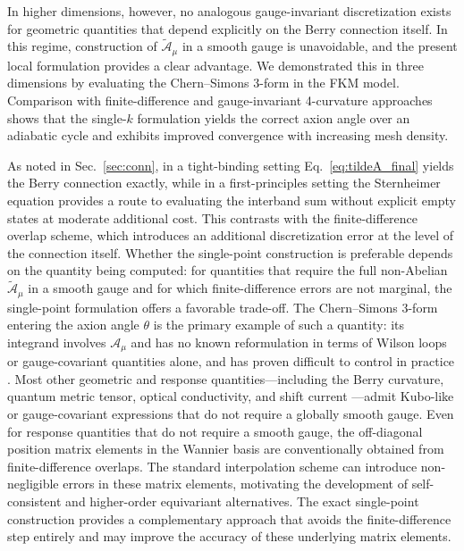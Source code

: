 \documentclass[galley,aps,pra,10pt,amsmath,amssymb,
    superscriptaddress,nofootinbib,longbibliography]{revtex4-2}
\begin{document}
In higher dimensions, however, no analogous gauge-invariant discretization exists for geometric quantities that depend explicitly on the Berry connection itself. In this regime, construction of $\tilde{\mathcal{A}}_\mu$ in a smooth gauge is unavoidable, and the present local formulation provides a clear advantage. We demonstrated this in three dimensions by evaluating the Chern--Simons 3-form in the FKM model. Comparison with finite-difference and gauge-invariant 4-curvature approaches shows that the single-$k$ formulation yields the correct axion angle over an adiabatic cycle and exhibits improved convergence with increasing mesh density. 
 
As noted in Sec.~\ref{sec:conn}, in a tight-binding setting Eq.~\ref{eq:tildeA_final} yields the Berry connection exactly, while in a first-principles setting the Sternheimer equation provides a route to evaluating the interband sum without explicit empty states at moderate additional cost. This contrasts with the finite-difference overlap scheme, which introduces an additional discretization error at the level of the connection itself. Whether the single-point construction is preferable depends on the quantity being computed: for quantities that require the full non-Abelian $\tilde{\mathcal{A}}_\mu$ in a smooth gauge and for which finite-difference errors are not marginal, the single-point formulation offers a favorable trade-off. The Chern--Simons 3-form entering the axion angle $\theta$ is the primary example of such a quantity: its integrand involves $\mathcal{A}_\mu$ and has no known reformulation in terms of Wilson loops or gauge-covariant quantities alone, and has proven difficult to control in practice \cite{coh2011chern, Liu2015, olsen2017surface, varnava2020axion}. Most other geometric and response quantities---including the Berry curvature, quantum metric tensor, optical conductivity, and shift current \cite{ponce2021, azpiroz2018}---admit Kubo-like or gauge-covariant expressions that do not require a globally smooth gauge. Even for response quantities that do not require a smooth gauge, the off-diagonal position matrix elements in the Wannier basis are conventionally obtained from finite-difference overlaps. The standard interpolation scheme can introduce non-negligible errors in these matrix elements, motivating the development of self-consistent \cite{thummler2026} and higher-order equivariant \cite{lihm2026} alternatives. The exact single-point construction provides a complementary approach that avoids the finite-difference step entirely and may improve the accuracy of these underlying matrix elements.
\end{document}
